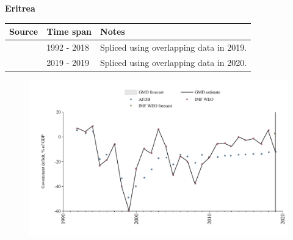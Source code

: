 \documentclass[12pt,a4paper,landscape]{article}
\begin{document}
\begin{adjustbox}{max totalsize={\paperwidth}{\paperheight},center}
\begin{minipage}[t][\textheight][t]{\textwidth}
\vspace*{0.5cm}
{}
\begin{center}
{\Large\bfseries Eritrea}
\end{center}
\vspace{0.5cm}
\begin{table}[H]
\centering
\small
\begin{tabular}{|l|l|l|}
\hline
\textbf{Source} & \textbf{Time span} & \textbf{Notes} \\
\hline
\rowcolor{white}\cite{IMF_WEO}& 1992 - 2018 &Spliced using overlapping data in 2019.\\
\rowcolor{lightgray}\cite{AFDB}& 2019 - 2019 &Spliced using overlapping data in 2020.\\
\hline
\end{tabular}
\end{table}
\begin{figure}[H]
\centering
\includegraphics[width=\textwidth,height=0.6\textheight,keepaspectratio]{graphs/ERI_govdef_GDP.pdf}
\end{figure}
\end{minipage}
\end{adjustbox}
\end{document}

